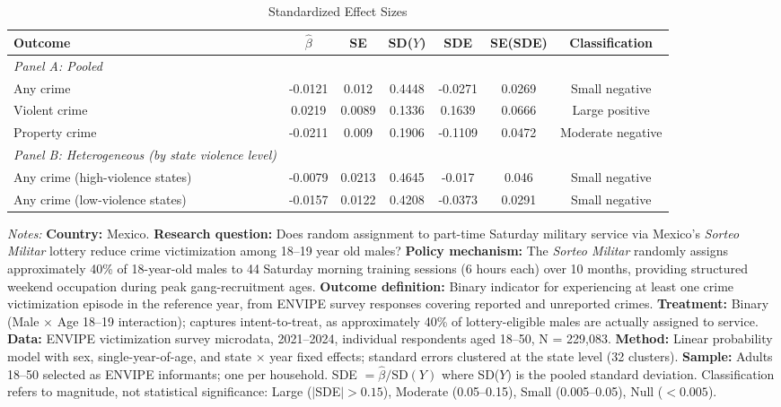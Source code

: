 \begin{table}[t]\begin{threeparttable}
\centering
\caption{Standardized Effect Sizes}
\label{tab:sde}
\begin{adjustbox}{max width=\textwidth}
\begin{tabular}{lcccccc}
\hline\hline
Outcome & $\hat{\beta}$ & SE & SD($Y$) & SDE & SE(SDE) & Classification \\
\hline
\addlinespace
\textit{Panel A: Pooled} \\
\addlinespace
Any crime & -0.0121 & 0.012 & 0.4448 & -0.0271 & 0.0269 & Small negative \\
Violent crime & 0.0219 & 0.0089 & 0.1336 & 0.1639 & 0.0666 & Large positive \\
Property crime & -0.0211 & 0.009 & 0.1906 & -0.1109 & 0.0472 & Moderate negative \\
\addlinespace
\textit{Panel B: Heterogeneous (by state violence level)} \\
\addlinespace
Any crime (high-violence states) & -0.0079 & 0.0213 & 0.4645 & -0.017 & 0.046 & Small negative \\
Any crime (low-violence states) & -0.0157 & 0.0122 & 0.4208 & -0.0373 & 0.0291 & Small negative \\
\hline\hline
\end{tabular}
\end{adjustbox}
\vspace{0.5em}\begin{tablenotes}[flushleft]
\small
\item \textit{Notes:} \textbf{Country:} Mexico. \textbf{Research question:} Does random assignment to part-time Saturday military service via Mexico's \textit{Sorteo Militar} lottery reduce crime victimization among 18--19 year old males? \textbf{Policy mechanism:} The \textit{Sorteo Militar} randomly assigns approximately 40\% of 18-year-old males to 44 Saturday morning training sessions (6 hours each) over 10 months, providing structured weekend occupation during peak gang-recruitment ages. \textbf{Outcome definition:} Binary indicator for experiencing at least one crime victimization episode in the reference year, from ENVIPE survey responses covering reported and unreported crimes. \textbf{Treatment:} Binary (Male $\times$ Age 18--19 interaction); captures intent-to-treat, as approximately 40\% of lottery-eligible males are actually assigned to service. \textbf{Data:} ENVIPE victimization survey microdata, 2021--2024, individual respondents aged 18--50, N = 229,083. \textbf{Method:} Linear probability model with sex, single-year-of-age, and state $\times$ year fixed effects; standard errors clustered at the state level (32 clusters). \textbf{Sample:} Adults 18--50 selected as ENVIPE informants; one per household. SDE $= \hat{\beta} / \text{SD}(Y)$ where SD($Y$) is the pooled standard deviation. Classification refers to magnitude, not statistical significance: Large ($|$SDE$| > 0.15$), Moderate (0.05--0.15), Small (0.005--0.05), Null ($< 0.005$).
\end{tablenotes}
\end{threeparttable}\end{table}

